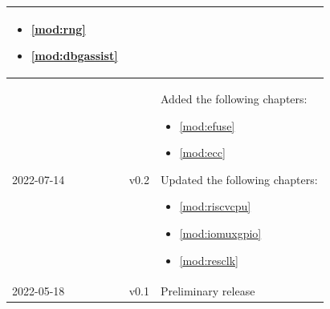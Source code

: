 \begin{longtable}[l]{ | m{2cm} | m{1.5cm} | m{12cm} | }
\begin{itemize}
                \item \ref{mod:rng} \textit{\nameref{mod:rng}}
                \item \ref{mod:dbgassist} \textit{\nameref{mod:dbgassist}}
            \end{itemize}
 \\\hline
    2022-07-14 & v0.2 &
        Added the following chapters:
            \begin{itemize}
                \item \ref{mod:efuse} \textit{\nameref{mod:efuse}}
                \item \ref{mod:ecc} \textit{\nameref{mod:ecc}}
            \end{itemize}
        Updated the following chapters:
            \begin{itemize}
                \item \ref{mod:riscvcpu} \textit{\nameref{mod:riscvcpu}}
                \item \ref{mod:iomuxgpio} \textit{\nameref{mod:iomuxgpio}}
                \item \ref{mod:resclk} \textit{\nameref{mod:resclk}}
            \end{itemize}
 \\\hline
        2022-05-18 & v0.1 & Preliminary release \\\hline
\end{longtable}
